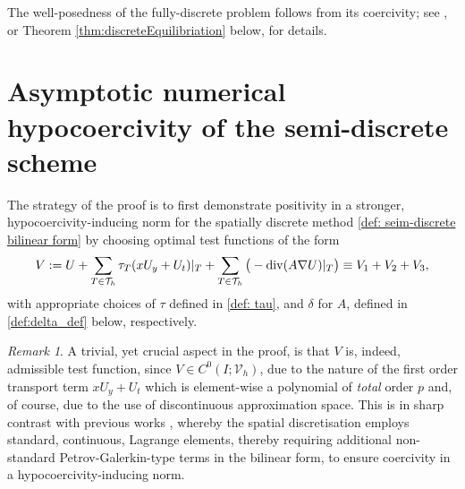 \documentclass{amsart}
\newcommand{\su}{\sum_{T \in \Th}}
\newcommand{\Th}{\mathcal{T}_h}
\newcommand{\Div}{{\rm div}}
\theoremstyle{definition}
\theoremstyle{remark}
\newtheorem{remark}[theorem]{Remark}
\numberwithin{equation}{section}
\begin{document}
The well-posedness of the fully-discrete problem follows from its coercivity; see \cite{hss}, or Theorem \ref{thm:discreteEquilibriation} below, for details.



\section{Asymptotic numerical hypocoercivity of the semi-discrete scheme}\label{sec:semi-discrete}
The strategy of the proof is to first demonstrate positivity in a stronger, hypo\-coercivity-inducing norm for the spatially discrete method \eqref{def: seim-discrete bilinear form}  by choosing optimal test functions of the form
\begin{equation}\label{semi: test function}
V: = U + \su\tau_T (x U_y + U_t)|_T + \su \big(-\Div (A\nabla U)|_T \big)\equiv V_1+ V_2 +V_3,
\end{equation}
with appropriate choices of $\tau$ defined in \eqref{def: tau}, and $\delta$ for $A$, defined in \eqref{def:delta_def} below, respectively.
\begin{remark}
A trivial, yet crucial aspect in the proof, is that $V$ is, indeed, admissible test function, since $V\in C^0(I; {\mathcal{V}}_h)$,  due to the nature of the first order transport term $x U_y + U_t$  which is element-wise a polynomial of \emph{total} order $p$ and, of course, due to the use of discontinuous approximation space. This is in sharp contrast with previous works \cite{georgoulis,DonGeoHer24}, whereby the spatial discretisation employs  standard, continuous, Lagrange elements, thereby requiring additional non-standard Petrov-Galerkin-type terms in the bilinear form, to ensure coercivity in a hypocoercivity-inducing norm.
\end{remark}
\end{document}
